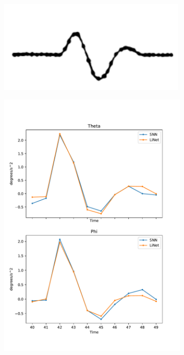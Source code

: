 \documentclass [MS] {UCLAthesis}
\begin{document}
\begin{figure}
    \centering

    \begin{subfigure}[b]{0.2\textwidth}
        \centering
        \includegraphics[width=\textwidth]{saccade_human_acc}
        \caption{}
        \label{fig:saccade_human_acc}
    \end{subfigure}
    \hfill
    \begin{subfigure}[b]{0.2\textwidth}
        \centering
        \includegraphics[width=\textwidth]{saccade_human_acc_normal}

\end{subfigure}
\end{figure}
\end{document}
